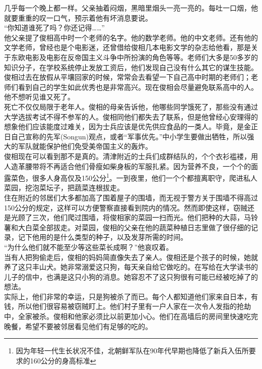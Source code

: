 几乎每一个晚上都一样。父亲抽着闷烟，黑暗里烟头一亮一亮的。每吐一口烟，他就要重重的叹一口气，预示着他有坏消息要说。\\

“你知道谁死了吗？你还记得……”\\

他父亲提了俊相高中时一个老师的名字。他的数学老师。他的中文老师。还有他的文学老师，曾经也是个电影迷，还曾借给俊相几本电影文学的杂志给他看，那是关于东欧电影及电影在反帝国主义斗争中所扮演的角色等等。老师们大多是50多岁的知识分子，在学校系统停止发放工资后，他们发现自己没有什么其它的谋生技能。俊相过去在放假从平壤回家的时候，常常会去看望一下自己高中时期的老师们；老师们看到自己的学生如此优秀也是非常高兴。现在俊相会尽量避免联系高中的人。他不想听见谁又死了。\\

死亡不仅仅局限于老年人。俊相的母亲告诉他，他哪些同学饿死了，那些没有通过大学选拔考试不得不参军的人。俊相同他们都失去了联系，但是他曾经心安理得的想象他们应该能度过难关，因为士兵应该是优先供应食品的一类人。毕竟，是金正日自己宣称的先军(Songun)观点，或者“军事优先。”中小学生要做出牺牲，所以强大的军队就能保护他们免受美帝国主义的轰炸。\\

俊相现在可以看到那不是真的。清津附近的士兵们成群结队的，个个衣衫褴褛，用人造革腰带将不再适合他们骨瘦如柴身板的军服扎紧。因为营养不良，一个个的面露菜色，很多人身高仅及150公分\footnote{因为年轻一代生长状况不佳，北朝鲜军队在90年代早期也降低了新兵入伍所要求的160公分的身高标准}。一到夜里，他们一个个都擅离职守，爬进私人菜园，挖泡菜坛子，把蔬菜连根拔走。\\

住在附近的邻居们大多都加高了围着屋子的围墙，而无视于警方关于围墙不得高过150公分的规定，这样可以方便警察直接看到院内的情况。然而即使这样，窃贼还是光顾了三次，他们爬过围墙，将俊相家的菜园一扫而光。他们把种的大蒜，马铃薯和大白菜全部拔走。对菜园，俊相的父亲在他的蔬菜种植日志里做了很仔细的记录，记下他用的是什么类型的种子，以及发芽所需的时间。\\

“为什么他们就不能至少等这些菜长成啊？”他哀叹着。\\

当有人把狗偷走后，俊相的妈妈简直像失去了亲人。俊相还是个孩子的时候，她就养了这只丰山犬。她非常溺爱这只狗，每天亲自给它做吃的。在写给在大学读书的儿子的信中，也满是这只小狗的消息。她容忍不了这只狗很有可能已经被吃掉了的想法。\\

实际上，他们非常的幸运，只是狗被杀了而已。每个人都知道他们家来自日本，有钱，所以他们很容易被窃贼盯上。他们村子里有一户人家在一次令人发指的抢劫中，全家被杀。俊相和他家必须比以前更加小心。他们在高墙后的房间里快速吃完晚餐，希望不要被邻居看见他们有足够的吃的。\\

